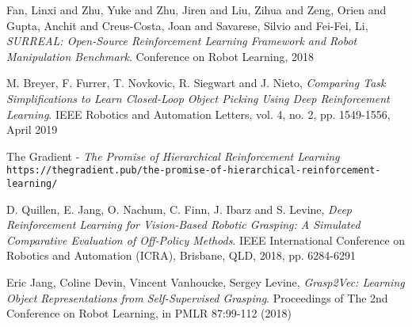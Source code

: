 \documentclass[11pt,a4paper]{article}
\begin{document}
\begin{thebibliography}{9}
Fan, Linxi and Zhu, Yuke and Zhu, Jiren and Liu, Zihua and Zeng, Orien and Gupta, Anchit and Creus-Costa, Joan and Savarese, Silvio and Fei-Fei, Li, 
\textit{SURREAL: Open-Source Reinforcement Learning Framework and Robot Manipulation Benchmark}. 
Conference on Robot Learning, 2018

M. Breyer, F. Furrer, T. Novkovic, R. Siegwart and J. Nieto, 
\textit{Comparing Task Simplifications to Learn Closed-Loop Object Picking Using Deep Reinforcement Learning}. 
IEEE Robotics and Automation Letters, vol. 4, no. 2, pp. 1549-1556, April 2019

The Gradient - \textit{The Promise of Hierarchical Reinforcement Learning}
\\\texttt{https://thegradient.pub/the-promise-of-hierarchical-reinforcement-learning/}

D. Quillen, E. Jang, O. Nachum, C. Finn, J. Ibarz and S. Levine, 
\textit{Deep Reinforcement Learning for Vision-Based Robotic Grasping: A Simulated Comparative Evaluation of Off-Policy Methods}.
IEEE International Conference on Robotics and Automation (ICRA), Brisbane, QLD, 2018, pp. 6284-6291

Eric Jang, Coline Devin, Vincent Vanhoucke, Sergey Levine, 
\textit{Grasp2Vec: Learning Object Representations from Self-Supervised Grasping}.
Proceedings of The 2nd Conference on Robot Learning, in PMLR 87:99-112 (2018)
\end{thebibliography}
\end{document}

